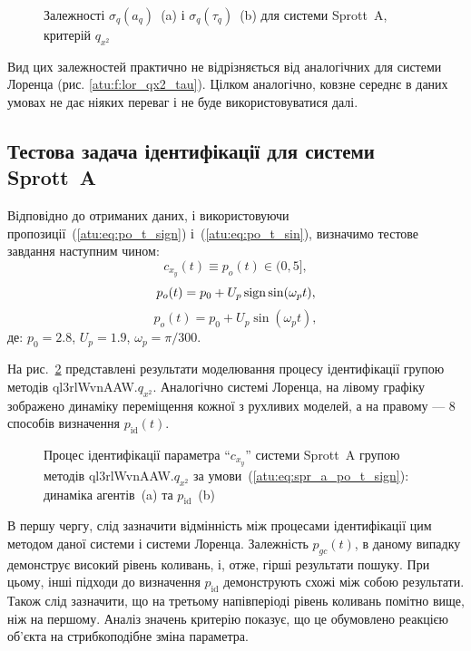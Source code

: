 \begin{figure}[htb!]
  \caption{Залежності $\sigma_{q} (a_q)$~(a) і $\sigma_{q}(\tau_q)$~(b) для системи Sprott~A, критерій $q_{x^2}$}
  \label{atu:f:spr_a_qx2_tau}
\end{figure}

Вид цих залежностей практично не відрізняється від аналогічних
для системи Лоренца (рис. \ref{atu:f:lor_qx2_tau}). Цілком аналогічно,
ковзне середнє в даних умовах не дає ніяких переваг і не буде
використовуватися далі.



\subsection{Тестова задача ідентифікації для системи Sprott~A} %

Відповідно до отриманих даних, і використовуючи
пропозиції~(\ref{atu:eq:po_t_sign}) і~(\ref{atu:eq:po_t_sin}),
%
визначимо тестове завдання наступним чином:
\[
  c_{x_y}(t) \equiv p_o(t) \in (0, 5],
\]
%
\begin{equation}
  p_o(t) = p_0 +  U_{p} \operatorname*{sign} \sin( \omega_{p} t ),
  \label{atu:eq:spr_a_po_t_sign}
\end{equation}
%
%
\begin{equation}
  p_o(t) = p_0 +  U_{p} \sin( \omega_{p} t ),
  \label{atu:eq:spr_a_po_t_sin}
\end{equation}
%
де:
$p_0 = 2.8$, $U_p=1.9$, $\omega_p=\pi/300$.

На рис.~\ref{atu:f:spr_a_id_ql3rlWvnAAW_q_x2_sign}
представлені результати моделювання процесу ідентифікації групою методів ql3rlWvnAAW.$q_{x^2}$.
Аналогічно системі Лоренца, на лівому графіку зображено
динаміку переміщення кожної з рухливих моделей, а на правому ---
8 способів визначення
$p_\mathrm{id} (t)$.

\begin{figure}[htb!]
  \caption{Процес ідентифікації параметра ``$c_{x_y}$'' системи Sprott~A групою методів ql3rlWvnAAW.$q_{x^2}$ за умови~(\ref{atu:eq:spr_a_po_t_sign}): динаміка агентів~(a) та $p_\mathrm{id}$~(b)}
  \label{atu:f:spr_a_id_ql3rlWvnAAW_q_x2_sign}
\end{figure}

В першу чергу, слід зазначити відмінність між процесами
ідентифікації цим методом даної системи і системи Лоренца.
Залежність $p_{gc}(t)$, в даному випадку демонструє високий
рівень коливань, і, отже, гірші результати пошуку. При цьому, інші підходи до
визначення $p_\mathrm{id}$ демонструють схожі між собою результати.
Також слід зазначити, що на третьому напівперіоді рівень
коливань помітно вище, ніж на першому. Аналіз значень критерію
показує, що це обумовлено реакцією об'єкта на стрибкоподібне
зміна параметра.



